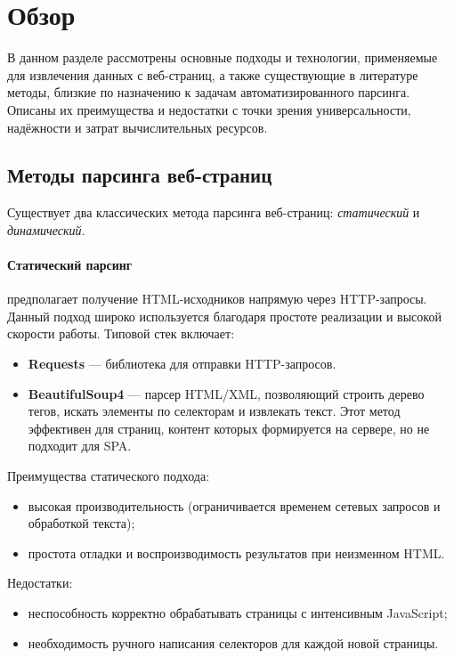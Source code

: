 
\section{Обзор}
\label{sec:relatedworks}

В данном разделе рассмотрены основные подходы и технологии, применяемые для извлечения данных с веб-страниц, а также существующие в литературе методы, близкие по назначению к задачам автоматизированного парсинга. Описаны их преимущества и недостатки с точки зрения универсальности, надёжности и затрат вычислительных ресурсов.

\subsection{Методы парсинга веб-страниц}

Существует два классических метода парсинга веб-страниц: \emph{статический} и \emph{динамический}.

\paragraph{Статический парсинг} предполагает получение HTML-исходников напрямую через HTTP-запросы. Данный подход широко используется благодаря простоте реализации и высокой скорости работы. Типовой стек включает:
\begin{itemize}
    \item \textbf{Requests} — библиотека для отправки HTTP-запросов\cite{RequestsDocumentation}.
    \item \textbf{BeautifulSoup4}\cite{BeautifulSoupDocumentation} — парсер HTML/XML, позволяющий строить дерево тегов, искать элементы по селекторам и извлекать текст. Этот метод эффективен для страниц, контент которых формируется на сервере, но не подходит для SPA\cite{Cribbs2019}.
\end{itemize}
Преимущества статического подхода:
\begin{itemize}
    \item высокая производительность (ограничивается временем сетевых запросов и обработкой текста)\cite{Richardson2013};
    \item простота отладки и воспроизводимость результатов при неизменном HTML.
\end{itemize}
Недостатки:
\begin{itemize}
    \item неспособность корректно обрабатывать страницы с интенсивным JavaScript\cite{SeleniumDocumentation};
    \item необходимость ручного написания селекторов для каждой новой страницы.
\end{itemize}

